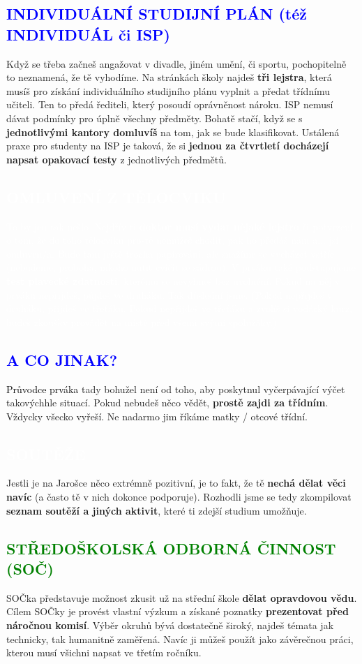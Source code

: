 \documentclass[a5paper, twoside]{article}
\newcommand{\boxik}[3]{
  \begin{tcolorbox}[
    sharp corners,
    colback = #1,
    boxrule = 0pt,
    grow to left by = 25pt,
    grow to right by = 25pt,
    right = 22pt,
    left = 22pt%
  ]
    \textcolor{#2}{#3}
  \end{tcolorbox}
}
\newcommand{\nadpis}[4]{
  \vspace*{-50pt}
  \begin{tcolorbox}[colback = #2, boxrule = 0pt, grow to left by = #4,  grow to right by = #4, arc=8pt, height = 40pt]
    \vspace*{5pt}
    \centering \section*{\textcolor{#3}{#1}}
  \end{tcolorbox}
}
\newcommand{\podnadpis}[2]{
  \subsection*{\textcolor{#2}{#1}}
}
\begin{document}
\podnadpis{INDIVIDUÁLNÍ STUDIJNÍ PLÁN (též INDIVIDUÁL či ISP)}{blue}
Když se třeba začneš angažovat v divadle, jiném umění, či sportu, pochopitelně to neznamená, že tě vyhodíme. Na stránkách školy najdeš \textbf{tři lejstra}, která musíš pro získání individuálního studijního plánu vyplnit a předat třídnímu učiteli. Ten to předá řediteli, který posoudí oprávněnost nároku.
ISP nemusí dávat podmínky pro úplně všechny předměty. Bohatě stačí, když se
s \textbf{jednotlivými kantory domluvíš} na tom, jak se bude klasifikovat. Ustálená praxe pro studenty na ISP je taková, že si \textbf{jednou za čtvrtletí docházejí napsat opakovací testy} z jednotlivých předmětů.

\boxik{blue}{white}{\subsection*{OMLUVENÍ Z TĚLOCVIKU}
  To by jen tak nešlo. Nejdřív ti \textbf{doktor musí vydat nějaké lejstro} či potvrzení o tom, že do toho tělocviku prostě nemůžeš chodit, pak ho předáš nám a... jsi omluven/a. Bude tam ještě trocha papírování, ale snažíme se vycházet vstříc (nebudeme, proboha, nikoho nutit cvičit se sádrou). V prváku také podstupujeme \textbf{test plavecké zdatnosti}, kterému se nevyhneš bez uvolnění. Pokud na něj v prváku nepřijdeš, půjdeš ve druháku. Tak důslední jsme. (Pokud nepřijdeš v druháku, přijdeš ve třeťáku. Pokud nepřijdeš ve třeťáku a zvolíš si vodácký kurz, budeš zkoušky provádět na místě před všemi svými spolužáky.)}

\podnadpis{A CO JINAK?}{blue}
\textcolor{black}{\Kapitan Průvodce prváka} tady bohužel není od toho, aby poskytnul vyčerpávající výčet takovýchhle situací. Pokud nebudeš něco vědět, \textbf{prostě zajdi za třídním}. Vždycky všecko vyřeší. Ne nadarmo jim říkáme matky / otcové třídní.

\newpage

\nadpis{SOUTĚŽE}{green}{white}{-4.7cm}

\noindent Jestli je na Jarošce něco extrémně pozitivní, je to fakt, že tě \textbf{nechá dělat věci navíc} (a často tě v nich dokonce podporuje). Rozhodli jsme se tedy zkompilovat \textbf{seznam soutěží a jiných aktivit}, které ti zdejší studium umožňuje.

\podnadpis{STŘEDOŠKOLSKÁ ODBORNÁ ČINNOST (SOČ)}{green}
SOČka představuje možnost zkusit už na střední škole \textbf{dělat opravdovou vědu}. Cílem SOČky je provést vlastní výzkum a získané poznatky \textbf{prezentovat před náročnou komisí}. Výběr okruhů bývá dostatečně široký, najdeš témata jak technicky, tak humanitně zaměřená. Navíc ji můžeš použít jako závěrečnou práci, kterou musí všichni napsat ve třetím ročníku.
\end{document}
